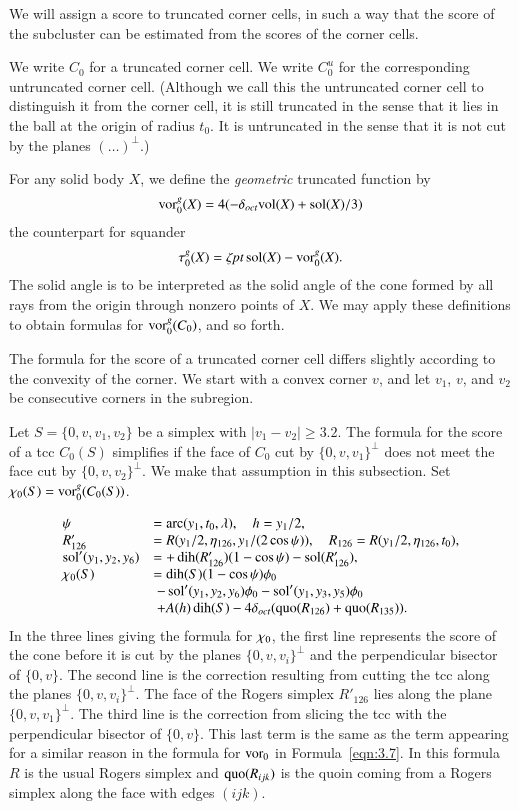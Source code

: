 We will assign a score to truncated corner cells, in such a way
that the score of the subcluster can be estimated from the scores
of the corner cells.

We write $C_0$ for a truncated corner cell.  We write $C_0^u$ for
the corresponding untruncated corner cell.  (Although we call this
the untruncated corner cell to distinguish it from the corner
cell, it is still truncated in the sense that it lies in the ball
at the origin of radius $t_0$.  It is untruncated in the sense
that it is not cut by the planes $(\ldots)^\perp$.)

For any solid body $X$, we define the {\it geometric} truncated
function by
    $$\operatorname{vor}_0^{g}(X) = 4(-\delta_{oct} {\operatorname{vol}}(X) + \operatorname{sol}(X)/3)$$
the counterpart for squander
    $$\tau_0^g(X) = \zeta\hbox{\it pt} \operatorname{sol}(X) - \operatorname{vor}_0^g(X).$$
The solid angle is to be interpreted as the solid angle of the
cone formed by all rays from the origin through nonzero points of
$X$. We may apply these definitions to obtain formulas for
$\operatorname{vor}_0^{g}(C_0)$, and so forth.

The formula for the score of a truncated corner cell differs
slightly according to the convexity of the corner.  We start with
a convex corner $v$, and let $v_1$, $v$, and $v_2$ be consecutive
corners in the subregion.






Let $S=\{0,v,v_1,v_2\}$ be a simplex with $|v_1-v_2|\ge3.2$. The
formula for the score of a tcc $C_0(S)$ simplifies if the face of
$C_0$ cut by $\{0,v,v_1\}^\perp$ does not meet the face cut by
$\{0,v,v_2\}^\perp$. We make that assumption in this subsection.
Set
    $\chi_0(S) =\operatorname{vor}^g_0(C_0(S))$.

    $$
    \begin{array}{lll}
        \psi &= \operatorname{arc}(y_1,t_0,\lambda),\quad h=y_1/2,\\
        R'_{126}&=R(y_1/2,\eta_{126},y_1/(2\cos\psi)),
        \quad R_{126}=R(y_1/2,\eta_{126},t_0),\\
        \operatorname{sol}'(y_1,y_2,y_6) &= +\operatorname{dih}(R'_{126})(1-\cos\psi)-\operatorname{sol}(R'_{126}),\\
        \chi_0(S) &= \operatorname{dih}(S)(1-\cos\psi)\phi_0\\
            &\ -\operatorname{sol}'(y_1,y_2,y_6)\phi_0 -\operatorname{sol}'(y_1,y_3,y_5)\phi_0\\
            &\ +A(h)\operatorname{dih}(S)-
                4\delta_{oct} (\operatorname{quo}(R_{126})+\operatorname{quo}(R_{135})).
    \end{array}
    $$
In the three lines giving the formula for $\chi_0$, the first line
represents the score of the cone before it is cut by the planes
$\{0,v,v_i\}^\perp$ and the perpendicular bisector of $\{0,v\}$.
The second line is the correction resulting from cutting the tcc
along the planes $\{0,v,v_i\}^\perp$. The face of the Rogers
simplex $R'_{126}$ lies along the plane $\{0,v,v_1\}^\perp$.  The
third line is the correction from slicing the tcc with the
perpendicular bisector of $\{0,v\}$.  This last term is the same
as the term appearing for a similar reason in the formula for
$\operatorname{vor}_0$ in Formula~\ref{eqn:3.7}. In this formula $R$ is the
usual Rogers simplex and $\operatorname{quo}(R_{ijk})$ is the quoin coming from
a Rogers simplex along the face with edges $(ijk)$.

